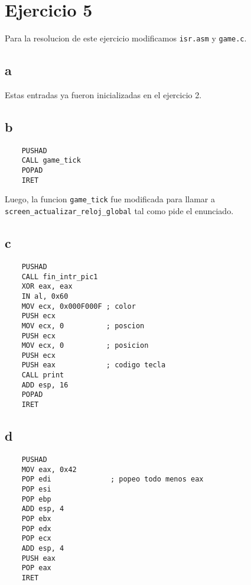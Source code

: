 \section{Ejercicio 5}

Para la resolucion de este ejercicio modificamos \texttt{isr.asm} y \texttt{game.c}.

\subsection{a}

Estas entradas ya fueron inicializadas en el ejercicio 2.

\subsection{b}

\begin{lstlisting}
	PUSHAD
	CALL game_tick
	POPAD
	IRET
\end{lstlisting}

Luego, la funcion \texttt{game\_tick} fue modificada para llamar a \texttt{screen\_actualizar\_reloj\_global} tal como pide el enunciado.

\subsection{c}

\begin{lstlisting}
	PUSHAD
	CALL fin_intr_pic1
	XOR eax, eax
	IN al, 0x60
	MOV ecx, 0x000F000F ; color
	PUSH ecx
	MOV ecx, 0          ; poscion
	PUSH ecx
	MOV ecx, 0          ; posicion
	PUSH ecx
	PUSH eax            ; codigo tecla
	CALL print
	ADD esp, 16
	POPAD
	IRET
\end{lstlisting}

\subsection{d}

\begin{lstlisting}
	PUSHAD
	MOV eax, 0x42
	POP edi              ; popeo todo menos eax
	POP esi
	POP ebp
	ADD esp, 4
	POP ebx
	POP edx
	POP ecx
	ADD esp, 4
	PUSH eax
	POP eax
	IRET
\end{lstlisting}